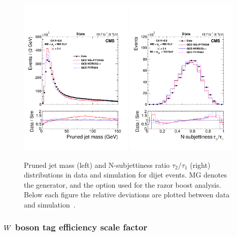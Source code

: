 \begin{figure}[htpb]
  \centering
  \includegraphics[width=0.48\textwidth]{figures/razor_wtag/substructure_pas_mass_2}
  \includegraphics[width=0.48\textwidth]{figures/razor_wtag/substructure_pas_tau21_aftermass_2}
  \caption{Pruned jet mass (left) and N-subjettiness ratio $\tau_2/\tau_1$ (right) distributions 
  in data and simulation for dijet events. MG denotes the \MADGRAPH generator, and the option used
  for the razor boost analysis. Below each figure the relative deviations are plotted between data
  and simulation~\cite{Khachatryan:2014vla}. 
  \label{fig:boost_wtag_data_sim}}  
\end{figure}


\subsubsection{\texorpdfstring{$W$}{W} boson tag efficiency scale factor \label{sec:wtag_eff_sf}}

